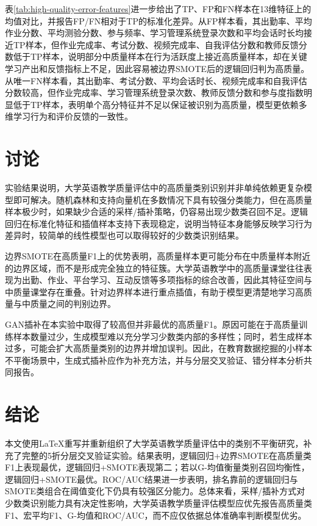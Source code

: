\documentclass[UTF8,a4paper,12pt,fontset=fandol]{ctexart}
\begin{document}
表\ref{tab:high-quality-error-features}进一步给出了TP、FP和FN样本在13维特征上的均值对比，并报告FP/FN相对于TP的标准化差异。从FP样本看，其出勤率、平均作业分数、平均测验分数、参与频率、学习管理系统登录次数和平均会话时长均接近TP样本，但作业完成率、考试分数、视频完成率、自我评估分数和教师反馈分数低于TP样本，说明部分中质量样本在行为活跃度上接近高质量样本，却在关键学习产出和反馈指标上不足，因此容易被边界SMOTE后的逻辑回归判为高质量。从唯一FN样本看，其出勤率、考试分数、平均会话时长、视频完成率和自我评估分数较高，但作业完成率、学习管理系统登录次数、教师反馈分数和参与度指数明显低于TP样本，表明单个高分特征并不足以保证被识别为高质量，模型更依赖多维学习行为和评价反馈的一致性。



\section{讨论}
实验结果说明，大学英语教学质量评估中的高质量类别识别并非单纯依赖更复杂模型即可解决。随机森林和支持向量机在多数情况下具有较强分类能力，但在高质量样本极少时，如果缺少合适的采样/插补策略，仍容易出现少数类召回不足。逻辑回归在标准化特征和插值样本支持下表现稳定，说明当特征本身能够反映学习行为差异时，较简单的线性模型也可以取得较好的少数类识别结果。

边界SMOTE在高质量F1上的优势表明，高质量样本更可能分布在中质量样本附近的边界区域，而不是形成完全独立的特征簇。大学英语教学中的高质量课堂往往表现为出勤、作业、平台学习、互动反馈等多项指标的综合改善，因此其特征空间与中质量课堂存在重叠。针对边界样本进行重点插值，有助于模型更清楚地学习高质量与中质量之间的判别边界。

GAN插补在本实验中取得了较高但并非最优的高质量F1。原因可能在于高质量训练样本数量过少，生成模型难以充分学习少数类内部的多样性；同时，若生成样本过多，可能会扩大高质量类别的边界并增加误判。因此，在教育数据挖掘的小样本不平衡场景中，生成式插补应作为补充方法，并与分层交叉验证、错分样本分析共同报告。

\section{结论}
本文使用LaTeX重写并重新组织了大学英语教学质量评估中的类别不平衡研究，补充了完整的5折分层交叉验证实验。结果表明，逻辑回归+边界SMOTE在高质量类F1上表现最优，逻辑回归+SMOTE表现第二；若以G-均值衡量类别召回均衡性，逻辑回归+SMOTE最优。ROC/AUC结果进一步表明，排名靠前的逻辑回归与SMOTE类组合在阈值变化下仍具有较强区分能力。总体来看，采样/插补方式对少数类识别能力具有决定性影响，大学英语教学质量评估模型应优先报告高质量类F1、宏平均F1、G-均值和ROC/AUC，而不应仅依据总体准确率判断模型优劣。
\end{document}

